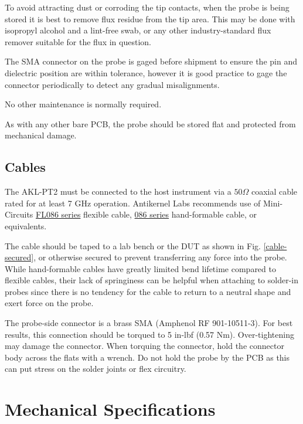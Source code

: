 \documentclass[11pt]{article}
\begin{document}
To avoid attracting dust or corroding the tip contacts, when the probe is being stored it is best to remove flux
residue from the tip area. This may be done with isopropyl alcohol and a lint-free swab, or any other industry-standard
flux remover suitable for the flux in question.

The SMA connector on the probe is gaged before shipment to ensure the pin and dielectric position are within tolerance,
however it is good practice to gage the connector periodically to detect any gradual misalignments.

No other maintenance is normally required.

As with any other bare PCB, the probe should be stored flat and protected from mechanical damage.

\FloatBarrier
\subsection{Cables}

The AKL-PT2 must be connected to the host instrument via a $50 \Omega$ coaxial cable rated for at least 7 GHz operation.
Antikernel Labs recommends use of Mini-Circuits \href{https://www.minicircuits.com/pdfs/FL086-24SM+.pdf}{FL086 series}
flexible cable, \href{https://www.minicircuits.com/pdfs/086-24SM+.pdf}{086 series} hand-formable cable, or equivalents.

The cable should be taped to a lab bench or the DUT as shown in Fig. \ref{cable-secured}, or otherwise secured to
prevent transferring any force into the probe. While hand-formable cables have greatly limited bend lifetime compared
to flexible cables, their lack of springiness can be helpful when attaching to solder-in probes since there is no
tendency for the cable to return to a neutral shape and exert force on the probe.

The probe-side connector is a brass SMA (Amphenol RF 901-10511-3). For best results, this connection should be torqued
to 5 in-lbf (0.57 Nm). Over-tightening may damage the connector. When torquing the connector, hold the connector body
across the flats with a wrench. Do not hold the probe by the PCB as this can put stress on the solder joints or flex
circuitry.

\pagebreak

\section{Mechanical Specifications}
\end{document}
